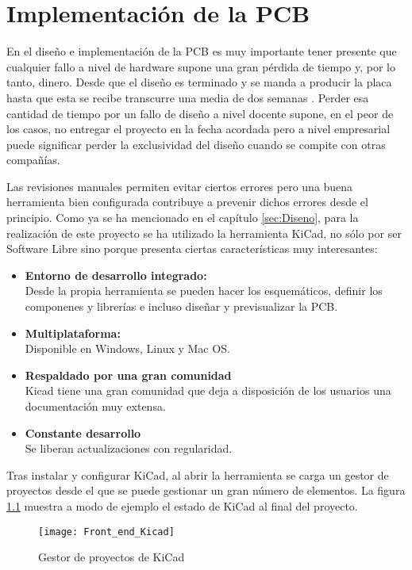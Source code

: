 \chapter{Implementación de la PCB\label{sec:Implementacion_PCB}}

En el diseño e implementación de la \acrshort{PCB} es muy importante tener presente que cualquier fallo a nivel de hardware supone una gran pérdida de tiempo y, por lo tanto, dinero. Desde que el diseño es terminado y se manda a producir la placa hasta que esta se recibe transcurre una media de dos semanas . Perder esa cantidad de tiempo por un fallo de diseño a nivel docente supone, en el peor de los casos, no entregar el proyecto en la fecha acordada pero a nivel empresarial puede significar perder la exclusividad del diseño cuando se compite con otras compañías. 

Las revisiones manuales permiten evitar ciertos errores pero una buena herramienta bien configurada contribuye a prevenir dichos errores desde el principio. Como ya se ha mencionado en el capítulo \ref{sec:Diseno}, para la realización de este proyecto se ha utilizado la herramienta KiCad, no sólo por ser Software Libre sino porque presenta ciertas características muy interesantes:
\begin{itemize}
\item \textbf{Entorno de desarrollo integrado:}
\\Desde la propia herramienta se pueden hacer los esquemáticos, definir los componenes y librerías e incluso diseñar y previsualizar la PCB.
\item \textbf{Multiplataforma:}
\\Disponible en Windows, Linux y Mac OS.
\item \textbf{Respaldado por una gran comunidad} 
\\Kicad tiene una gran comunidad que deja a disposición de los usuarios una documentación muy extensa.
\item \textbf{Constante desarrollo}
\\Se liberan actualizaciones con regularidad.
\end{itemize}

Tras instalar y configurar KiCad, al abrir la herramienta se carga un gestor de proyectos desde el que se puede gestionar un gran número de elementos. La figura \ref{fig:Front_end_Kicad} muestra a modo de ejemplo el estado de KiCad al final del proyecto.

\begin{figure} [h]
    \centering
    \texttt{[image: Front\_end\_Kicad]}
    \caption{Gestor de proyectos de KiCad}
    \label{fig:Front_end_Kicad}
\end{figure}

